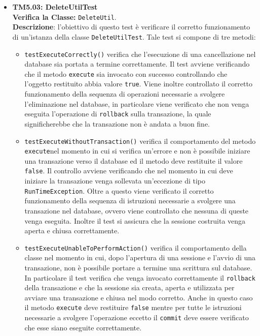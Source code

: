\begin{itemize}
\item \textbf{TM5.03: DeleteUtilTest}\\
\textbf{Verifica la Classe:} \texttt{DeleteUtil}.\\
\textbf{Descrizione}: l'obiettivo di questo test è verificare il corretto funzionamento di un'istanza della classe \texttt{DeleteUtilTest}.
Tale test si compone di tre metodi:
\begin{itemize}
\item \texttt{testExecuteCorrectly()} 
verifica che l'esecuzione di una cancellazione nel database sia portata a termine correttamente. Il test avviene verificando che il metodo \texttt{execute} sia invocato con successo controllando che l'oggetto restituito abbia valore \texttt{true}. Viene inoltre controllato il corretto funzionamento della sequenza di operazioni necessarie a svolgere l'eliminazione nel database, in particolare viene verificato che non venga eseguita l'operazione di \texttt{rollback} sulla transazione, la quale significherebbe che la transazione non è andata a buon fine.

\item \texttt{testExecuteWithoutTransaction()}  verifica il comportamento del metodo \texttt{execute}nel momento in cui si verifica un'errore e non è possibile iniziare una transazione verso il database ed il metodo deve restituite il valore \texttt{false}. Il controllo avviene verificando che nel momento in cui deve iniziare la transazione venga sollevata un'eccezione di tipo \texttt{RunTimeException}. Oltre a questo viene verificato il corretto funzionamento della sequenza di istruzioni necessarie a svolgere una transazione nel database, ovvero viene controllato che nessuna di queste venga eseguita. Inoltre il test si assicura che la sessione costruita venga aperta e chiusa correttamente.

\item \texttt{testExecuteUnableToPerformAction()} verifica il comportamento della classe nel momento in cui, dopo l'apertura di una sessione e l'avvio di una transazione, non è possibile portare a termine una scrittura sul database. In particolare il test verifica che venga invocato correttamente il \texttt{rollback} della transazione e che la sessione sia creata, aperta e utilizzata per avviare una transazione e chiusa nel modo corretto. Anche in questo caso il metodo \texttt{execute} deve restituire \texttt{false} mentre per tutte le istruzioni necessarie a svolgere l'operazione eccetto il \texttt{commit} deve essere verificato che esse siano eseguite correttamente.


\end{itemize}
\end{itemize}
